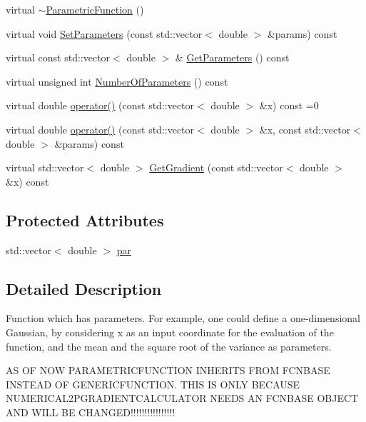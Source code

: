 \begin{DoxyCompactItemize}
virtual \mbox{\hyperlink{classROOT_1_1Minuit2_1_1ParametricFunction_a18aae731e634b4fc1c79403d8f49caa9}{$\sim$\+Parametric\+Function}} ()
\item 
virtual void \mbox{\hyperlink{classROOT_1_1Minuit2_1_1ParametricFunction_a63417244db376ec27f2c85ee6432f552}{Set\+Parameters}} (const std\+::vector$<$ double $>$ \&params) const
\item 
virtual const std\+::vector$<$ double $>$ \& \mbox{\hyperlink{classROOT_1_1Minuit2_1_1ParametricFunction_ac3e70b4d9b0cbe60c529823f6a612a5e}{Get\+Parameters}} () const
\item 
virtual unsigned int \mbox{\hyperlink{classROOT_1_1Minuit2_1_1ParametricFunction_a8e5e21de5e8f6e5bedd1ae7ea27b24ac}{Number\+Of\+Parameters}} () const
\item 
virtual double \mbox{\hyperlink{classROOT_1_1Minuit2_1_1ParametricFunction_a953426fa51c84cdef3eba24274131806}{operator()}} (const std\+::vector$<$ double $>$ \&x) const =0
\item 
virtual double \mbox{\hyperlink{classROOT_1_1Minuit2_1_1ParametricFunction_a5fab6e804e0f93bd593580f582b0f7c5}{operator()}} (const std\+::vector$<$ double $>$ \&x, const std\+::vector$<$ double $>$ \&params) const
\item 
virtual std\+::vector$<$ double $>$ \mbox{\hyperlink{classROOT_1_1Minuit2_1_1ParametricFunction_a209b13474fae14c1e4a5523c6850c7ed}{Get\+Gradient}} (const std\+::vector$<$ double $>$ \&x) const
\end{DoxyCompactItemize}
\subsection*{Protected Attributes}
\begin{DoxyCompactItemize}
\item 
std\+::vector$<$ double $>$ \mbox{\hyperlink{classROOT_1_1Minuit2_1_1ParametricFunction_aae3e17582748a80c3ff5eef35b8ca9ca}{par}}
\end{DoxyCompactItemize}


\subsection{Detailed Description}
Function which has parameters. For example, one could define a one-\/dimensional Gaussian, by considering x as an input coordinate for the evaluation of the function, and the mean and the square root of the variance as parameters. 

AS OF N\+OW P\+A\+R\+A\+M\+E\+T\+R\+I\+C\+F\+U\+N\+C\+T\+I\+ON I\+N\+H\+E\+R\+I\+TS F\+R\+OM F\+C\+N\+B\+A\+SE I\+N\+S\+T\+E\+AD OF G\+E\+N\+E\+R\+I\+C\+F\+U\+N\+C\+T\+I\+ON. T\+H\+IS IS O\+N\+LY B\+E\+C\+A\+U\+SE N\+U\+M\+E\+R\+I\+C\+A\+L2\+P\+G\+R\+A\+D\+I\+E\+N\+T\+C\+A\+L\+C\+U\+L\+A\+T\+OR N\+E\+E\+DS AN F\+C\+N\+B\+A\+SE O\+B\+J\+E\+CT A\+ND W\+I\+LL BE C\+H\+A\+N\+G\+E\+D!!!!!!!!!!!!!!!!

